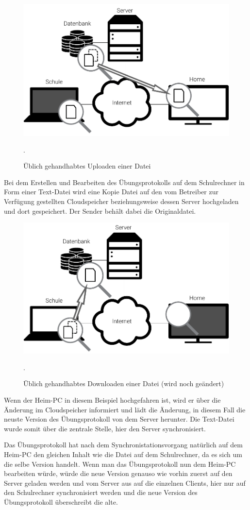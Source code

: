 \begin{figure}[h]
	\centering
  \includegraphics[]{images/dropbox_download}
  \caption{Üblich gehandhabtes Uploaden einer Datei}.
\end{figure}

Bei dem Erstellen und Bearbeiten des Übungsprotokolls auf dem Schulrechner in Form
einer Text-Datei wird eine Kopie Datei auf den vom Betreiber zur Verfügung gestellten
Cloudspeicher beziehungsweise dessen Server hochgeladen und dort gespeichert.
Der Sender behält dabei die Originaldatei.

\begin{figure}[h]
	\centering
  \includegraphics[]{images/dropbox_upload}
  \caption{Üblich gehandhabtes Downloaden einer Datei (wird noch geändert)}.
\end{figure}

Wenn der Heim-PC in diesem Beispiel hochgefahren ist, wird er
über die Änderung im Cloudspeicher informiert und lädt die Änderung, in
diesem Fall die neuste Version des Übungsprotokoll von dem Server herunter.
Die Text-Datei wurde somit über die zentrale Stelle, hier den Server synchronisiert.

Das Übungsprotokoll hat nach dem Synchronistationsvorgang natürlich auf dem Heim-PC
den gleichen Inhalt wie die Datei auf dem Schulrechner, da es sich um die selbe Version
handelt. Wenn man das Übungsprotokoll nun dem Heim-PC bearbeiten würde, würde
die neue Version genauso wie vorhin zuerst auf den Server geladen werden und vom Server
aus auf die einzelnen Clients, hier nur auf den Schulrechner synchronisiert
werden und die neue Version des Übungsprotokoll überschreibt die alte.
